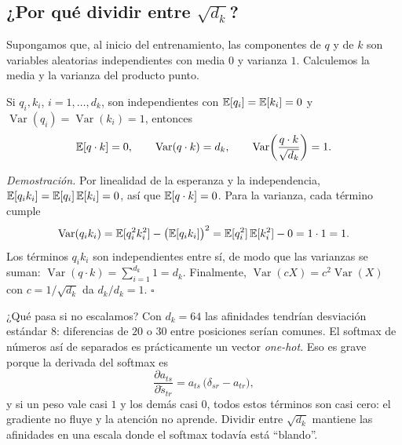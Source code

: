 \documentclass[11pt,letterpaper,oneside]{report}
\begin{document}
\subsection{¿Por qué dividir entre $\sqrt{d_k}$?}

Supongamos que, al inicio del entrenamiento, las componentes de $q$ y de $k$ son variables aleatorias independientes con media $0$ y varianza $1$. Calculemos la media y la varianza del producto punto.

\begin{teorema}
Si $q_i, k_i$, $i = 1,\dots,d_k$, son independientes con $\mathbb{E}[q_i]=\mathbb{E}[k_i]=0$ y $\operatorname{Var}(q_i)=\operatorname{Var}(k_i)=1$, entonces
\[
  \mathbb{E}[q\cdot k] = 0, \qquad \operatorname{Var}(q\cdot k) = d_k, \qquad \operatorname{Var}\!\left(\frac{q\cdot k}{\sqrt{d_k}}\right) = 1 .
\]
\end{teorema}

\textit{Demostración.} Por linealidad de la esperanza y la independencia, $\mathbb{E}[q_i k_i] = \mathbb{E}[q_i]\,\mathbb{E}[k_i] = 0$, así que $\mathbb{E}[q\cdot k] = 0$. Para la varianza, cada término cumple
\[
  \operatorname{Var}(q_i k_i) = \mathbb{E}[q_i^2 k_i^2] - \big(\mathbb{E}[q_i k_i]\big)^2 = \mathbb{E}[q_i^2]\,\mathbb{E}[k_i^2] - 0 = 1\cdot 1 = 1 .
\]
Los términos $q_i k_i$ son independientes entre sí, de modo que las varianzas se suman: $\operatorname{Var}(q\cdot k) = \sum_{i=1}^{d_k} 1 = d_k$. Finalmente, $\operatorname{Var}(cX) = c^2\operatorname{Var}(X)$ con $c = 1/\sqrt{d_k}$ da $d_k/d_k = 1$. $\square$

¿Qué pasa si no escalamos? Con $d_k = 64$ las afinidades tendrían desviación estándar $8$: diferencias de $20$ o $30$ entre posiciones serían comunes. El softmax de números así de separados es prácticamente un vector \emph{one-hot}. Eso es grave porque la derivada del softmax es
\begin{equation}\label{eq:jacobiano}
  \frac{\partial a_{t s}}{\partial \tilde s_{t r}} = a_{ts}\,\big(\delta_{sr} - a_{tr}\big),
\end{equation}
y si un peso vale casi $1$ y los demás casi $0$, todos estos términos son casi cero: el gradiente no fluye y la atención no aprende. Dividir entre $\sqrt{d_k}$ mantiene las afinidades en una escala donde el softmax todavía está ``blando''.
\end{document}
